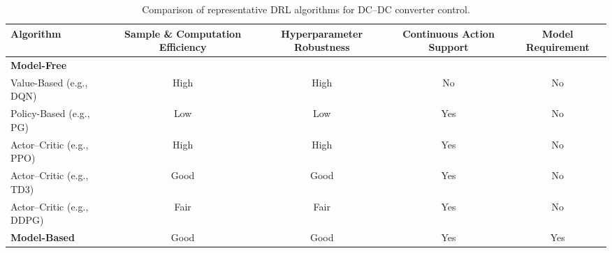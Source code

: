 \documentclass[conference]{IEEEtran}
\begin{document}
\begin{table}[t]
\centering
\caption{Comparison of representative DRL algorithms for DC--DC converter control.}
\label{tab:DRLcompare}
\begin{tabular}{lcccc}
\hline\hline
\textbf{Algorithm} & 
\textbf{Sample \& Computation Efficiency} & 
\textbf{Hyperparameter Robustness} & 
\textbf{Continuous Action Support} & 
\textbf{Model Requirement} \\
\hline
\textbf{Model-Free} &  &   &   &   \\
Value-Based (e.g., DQN)         & High     & High     & No      & No \\
Policy-Based (e.g., PG)         & Low      & Low      & Yes     & No \\
Actor--Critic (e.g., PPO)       & High & High & Yes     & No \\
Actor--Critic (e.g., TD3)       & Good     & Good     & Yes     & No \\
Actor--Critic (e.g., DDPG)      & Fair     & Fair     & Yes     & No \\
\hline
\textbf{Model-Based}     & Good     & Good     & Yes     & Yes \\
\hline
\end{tabular}

\end{table}
\end{document}

